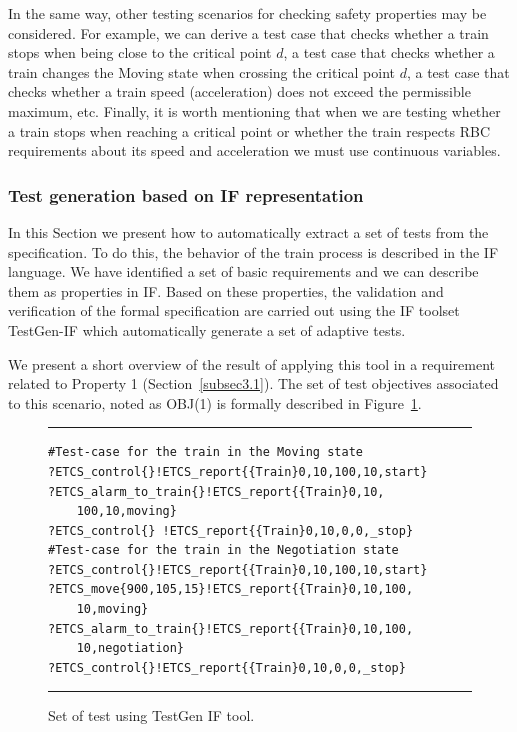 \documentclass{template/openetcs_article}
\begin{document}
In the same way, other testing scenarios for checking safety properties may be considered. For example, we can derive a test case that checks whether a train stops when being close to the critical point $d$, a test case that checks whether a train changes the Moving state when crossing the critical point $d$, a test case that checks whether a train speed (acceleration) does not exceed the permissible maximum, etc. Finally, it is worth mentioning that when we are testing whether a train stops when reaching a critical point or whether the train respects RBC requirements about its speed and acceleration we must use continuous variables.

\subsubsection{Test generation based on IF representation}

In this Section we present how to automatically extract a set of tests from the specification. To do this, the behavior of the train process is described in the IF language. We have identified a set of basic requirements and we can describe them as properties in IF.  Based on these properties, the validation and verification of the formal specification are carried out using the IF toolset TestGen-IF which automatically generate a set of adaptive tests.

We present a short overview of the result of applying this tool in a requirement related to Property 1 (Section~\ref{subsec3.1}). The set of test objectives associated to this scenario, noted as OBJ(1) is formally described in Figure~\ref{set:of:tests}.

\begin{figure}[t]
\hrule
\sspace

\begin{lstlisting}
#Test-case for the train in the Moving state
?ETCS_control{}!ETCS_report{{Train}0,10,100,10,start}
?ETCS_alarm_to_train{}!ETCS_report{{Train}0,10,
	100,10,moving}
?ETCS_control{} !ETCS_report{{Train}0,10,0,0,_stop}
#Test-case for the train in the Negotiation state
?ETCS_control{}!ETCS_report{{Train}0,10,100,10,start}
?ETCS_move{900,105,15}!ETCS_report{{Train}0,10,100,
	10,moving}
?ETCS_alarm_to_train{}!ETCS_report{{Train}0,10,100,
	10,negotiation}
?ETCS_control{}!ETCS_report{{Train}0,10,0,0,_stop}
\end{lstlisting}
\caption{Set of test using TestGen IF tool.\label{set:of:tests}}
\sspace
\hrule

\end{figure}
\end{document}
